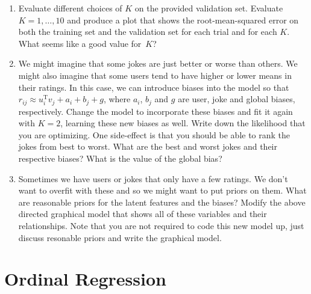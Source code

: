 \documentclass[10pt]{harvardml}
\theoremstyle{plain}
\begin{document}
\begin{problem}
\begin{enumerate}[label=(\alph*)]
\item Evaluate different choices of $K$ on the provided validation set. Evaluate $K = 1,
\ldots, 10$ and produce a plot that shows the root-mean-squared error on both
the training set and the validation set for each trial and for each $K$. What
seems like a good value for~$K$?

 \item We might imagine that some jokes are just better or worse than others.
We might also imagine that some users tend to have higher or lower means in
their ratings. In this case, we can introduce biases into the model so that
$r_{ij} \approx u_i^\text{T} v_j + a_i + b_j + g$, where $a_i$, $b_j$ and $g$ are user,
joke and global biases, respectively.  Change the model to incorporate these
biases and fit it again with $K=2$, learning these new biases as well. Write
down the likelihood that you are optimizing. One side-effect is that you should
be able to rank the jokes from best to worst. What are the best and worst jokes
and their respective biases?  What is the value of the global bias?

 \item Sometimes we have users or jokes that only have a few ratings. We don't
want to overfit with these and so we might want to put priors on them. What are
reasonable priors for the latent features and the biases? Modify the above directed
graphical model that shows all of these variables and their relationships.
Note that you are not required to code this new model up, just discuss
resonable priors and write the graphical model.


\end{enumerate}
\end{problem}



\section*{Ordinal Regression}
\end{document}
